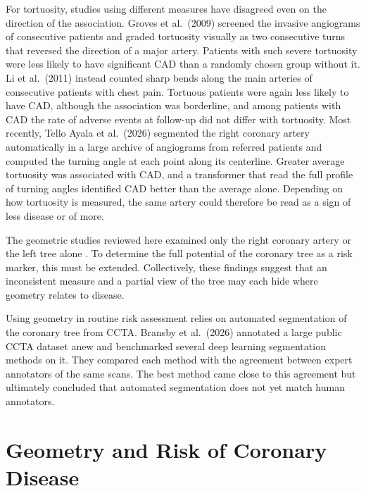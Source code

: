 For tortuosity, studies using different measures have disagreed even on the direction of the
association.
Groves et al.\ (2009) \cite{groves2009tortuosity} screened the invasive angiograms of consecutive
patients and graded tortuosity visually as two consecutive turns that reversed the direction of a
major artery.
Patients with such severe tortuosity were less likely to have significant CAD than a randomly chosen
group without it.
Li et al.\ (2011) \cite{li2011tortuosity} instead counted sharp bends along the main arteries of
consecutive patients with chest pain.
Tortuous patients were again less likely to have CAD, although the association was borderline, and
among patients with CAD the rate of adverse events at follow-up did not differ with tortuosity.
Most recently, Tello Ayala et al.\ (2026) \cite{telloayala2026tortuosity} segmented the right
coronary artery automatically in a large archive of angiograms from referred patients and computed
the turning angle at each point along its centerline.
Greater average tortuosity was associated with CAD, and a transformer that read the full profile of
turning angles identified CAD better than the average alone.
Depending on how tortuosity is measured, the same artery could therefore be read as a sign of less
disease or of more.

The geometric studies reviewed here examined only the right coronary artery or the left
tree alone \cite{telloayala2026tortuosity,garcha2025sensitivity,zhang2024curvature}.
To determine the full potential of the coronary tree as a risk marker, this must be extended.
Collectively, these findings suggest that an inconsistent measure
\cite{cui2017bifurcation,kashyap2022tortuosity} and a partial view of the tree may each hide where
geometry relates to disease.

Using geometry in routine risk assessment relies on automated segmentation of the coronary tree from
CCTA.
Bransby et al.\ (2026) \cite{bransby2026imagecasx} annotated a large public CCTA dataset anew and
benchmarked several deep learning segmentation methods on it.
They compared each method with the agreement between expert annotators of the same scans.
The best method came close to this agreement but ultimately concluded that automated
segmentation does not yet match human annotators.

\section{Geometry and Risk of Coronary Disease}
\label{sec:lit-risk}

